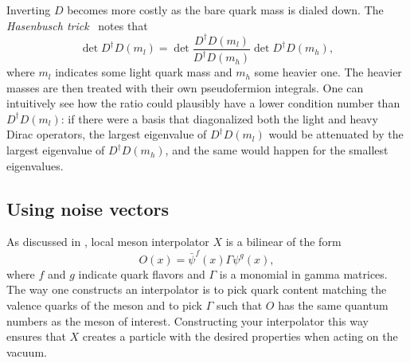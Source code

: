 Inverting $D$ becomes more costly as the bare quark mass is dialed down.
The {\it Hasenbusch trick}~\cite{hasenbusch_speeding_2001,urbach_hmc_2006}
notes that
\begin{equation}
\det D^{\dagger} D\left(m_l\right)=\det \frac{D^{\dagger}
D\left(m_l\right)}{D^{\dagger} D\left(m_h\right)} \det D^{\dagger}
D\left(m_h\right),
\end{equation}
where $m_l$ indicates some light quark mass and $m_h$ some heavier one.
The heavier masses are then treated with their own pseudofermion integrals.
One can intuitively see how the ratio could plausibly have a lower condition
number than $D^\dagger D(m_l)$: 
if there were a basis that diagonalized both the light and heavy Dirac
operators, the largest eigenvalue of $D^\dagger D(m_l)$ would be attenuated by
the largest eigenvalue of $D^\dagger D(m_h)$, and the same would happen for the
smallest eigenvalues.


\subsection{Using noise vectors}

As discussed in , local meson interpolator $X$ is a 
bilinear of the form
\begin{equation}
O(x)=\bar\psi^f(x)\Gamma\psi^g(x),
\end{equation}
where $f$ and $g$ indicate quark flavors and $\Gamma$ is a monomial in gamma
matrices. The way one constructs an interpolator is to pick quark content
matching the valence quarks of the meson and to pick $\Gamma$ such that $O$ has
the same quantum numbers as the meson of interest. Constructing your
interpolator this way ensures that $X$ creates a particle with the desired
properties when acting on the vacuum.










